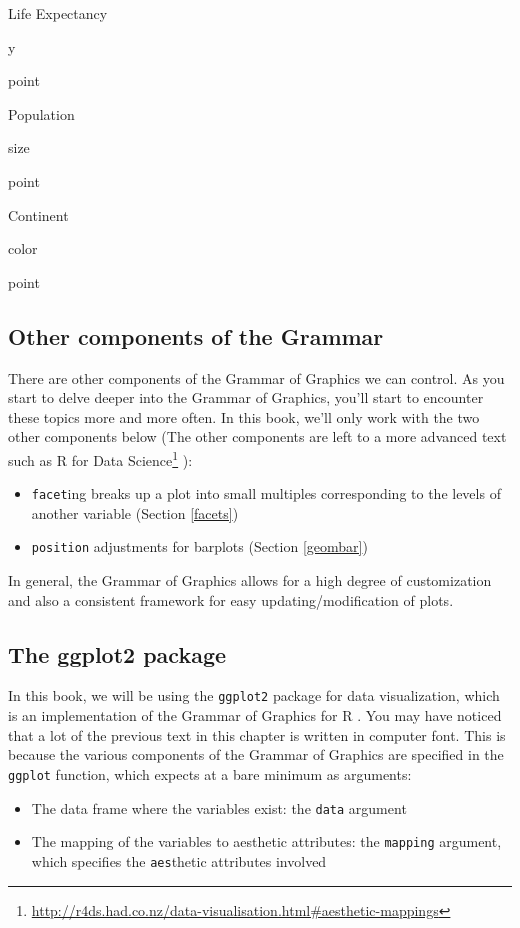 \documentclass[12pt,]{krantz}
\providecommand{\tightlist}{%
  \setlength{\itemsep}{0pt}\setlength{\parskip}{0pt}}
\renewcommand{\href}[2]{#2\footnote{\url{#1}}}
\begin{document}
Life Expectancy

y

point

Population

size

point

Continent

color

point

\subsection{Other components of the
Grammar}\label{other-components-of-the-grammar}

There are other components of the Grammar of Graphics we can control. As
you start to delve deeper into the Grammar of Graphics, you'll start to
encounter these topics more and more often. In this book, we'll only
work with the two other components below (The other components are left
to a more advanced text such as
\href{http://r4ds.had.co.nz/data-visualisation.html\#aesthetic-mappings}{R
for Data Science} \citep{rds2016}):

\begin{itemize}
\tightlist
\item
  \texttt{facet}ing breaks up a plot into small multiples corresponding
  to the levels of another variable (Section \ref{facets})
\item
  \texttt{position} adjustments for barplots (Section \ref{geombar}) 
\end{itemize}

In general, the Grammar of Graphics allows for a high degree of
customization and also a consistent framework for easy
updating/modification of plots.

\subsection{The ggplot2 package}\label{the-ggplot2-package}

In this book, we will be using the \texttt{ggplot2} package for data
visualization, which is an implementation of the Grammar of Graphics for
R \citep{R-ggplot2}. You may have noticed that a lot of the previous
text in this chapter is written in computer font. This is because the
various components of the Grammar of Graphics are specified in the
\texttt{ggplot} function, which expects at a bare minimum as arguments:

\begin{itemize}
\tightlist
\item
  The data frame where the variables exist: the \texttt{data} argument
\item
  The mapping of the variables to aesthetic attributes: the
  \texttt{mapping} argument, which specifies the \texttt{aes}thetic
  attributes involved
\end{itemize}
\end{document}
